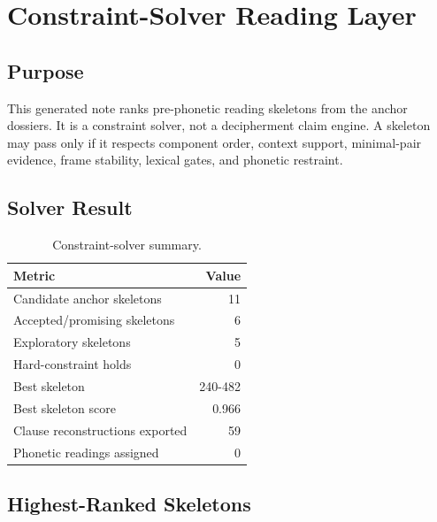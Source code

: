 \section{Constraint-Solver Reading Layer}

\subsection{Purpose}

This generated note ranks pre-phonetic reading skeletons from the anchor dossiers. It is a constraint solver, not a decipherment claim engine. A skeleton may pass only if it respects component order, context support, minimal-pair evidence, frame stability, lexical gates, and phonetic restraint.

\subsection{Solver Result}

\begin{table}[htbp]
\centering
\begin{tabular}{p{}r}
\toprule
\textbf{Metric} & \textbf{Value} \\
\midrule
Candidate anchor skeletons & 11 \\
Accepted/promising skeletons & 6 \\
Exploratory skeletons & 5 \\
Hard-constraint holds & 0 \\
Best skeleton & 240-482 \\
Best skeleton score & 0.966 \\
Clause reconstructions exported & 59 \\
Phonetic readings assigned & 0 \\
\bottomrule
\end{tabular}
\caption{Constraint-solver summary.}
\end{table}

\subsection{Highest-Ranked Skeletons}

